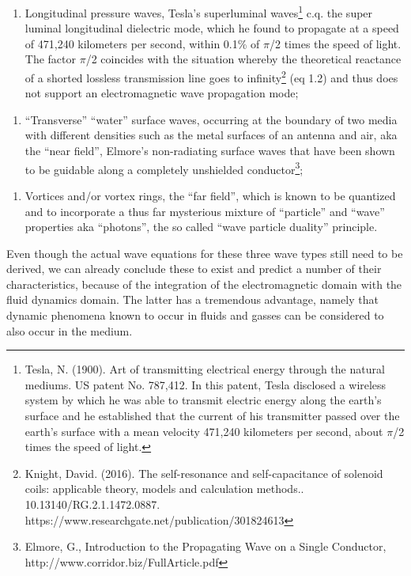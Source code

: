 \documentclass{article}
\begin{document}
\begin{enumerate}
\item Longitudinal pressure waves, Tesla's superluminal waves\footnote{ Tesla, N. (1900). Art of transmitting electrical
energy through the natural mediums. US patent No. 787,412. In this patent, Tesla disclosed a wireless system by which
he was able to transmit electric energy along the earth's surface and he established that the current of his
transmitter passed over the earth's surface with a mean velocity 471,240 kilometers per second, about $\pi $/2 times
the speed of light.\par } c.q. the super luminal longitudinal dielectric mode, which he found to propagate at a speed
of 471,240 kilometers per second, within 0.1\% of $\pi $/2 times the speed of light. The factor $\pi $/2 coincides with
the situation whereby the theoretical reactance of a shorted lossless transmission line goes to infinity\footnote{
Knight, David. (2016). The self-resonance and self-capacitance of solenoid coils: applicable theory, models and
calculation methods.. 10.13140/RG.2.1.1472.0887.  https://www.researchgate.net/publication/301824613 \par } (eq 1.2)
and thus does not support an electromagnetic wave propagation mode; 
\end{enumerate}
\begin{enumerate}
\item {}``Transverse'' ``water'' surface waves, occurring at the boundary of two media with different densities such as
the metal surfaces of an antenna and air, aka the ``near field'', Elmore's non-radiating surface waves that have been
shown to be guidable along a completely unshielded conductor\footnote{ Elmore, G., Introduction to the Propagating Wave
on a Single Conductor, http://www.corridor.biz/FullArticle.pdf\par };
\end{enumerate}
\begin{enumerate}
\item Vortices and/or vortex rings, the ``far field'', which is known to be quantized and to incorporate a thus far
mysterious mixture of ``particle'' and ``wave'' properties aka ``photons'', the so called ``wave particle duality''
principle. 
\end{enumerate}
Even though the actual wave equations for these three wave types still need to be derived, we can already conclude these
to exist and predict a number of their characteristics, because of the integration of the electromagnetic domain with
the fluid dynamics domain. The latter has a tremendous advantage, namely that dynamic phenomena known to occur in
fluids and gasses can be considered to also occur in the medium.
\end{document}
